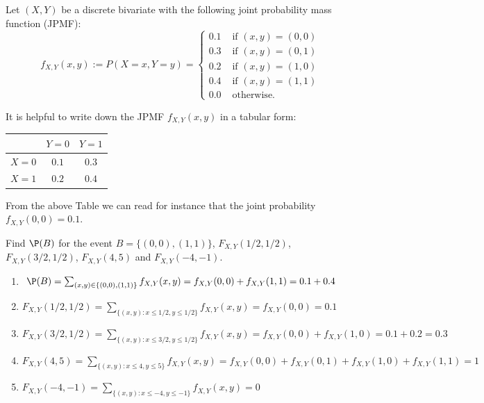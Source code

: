 \begin{example}\label{Eg:Discrete2DPMF}
Let $(X,Y)$ be a discrete bivariate \rv with the following joint probability mass function (JPMF):
\[
f_{X,Y}(x,y) := P (X=x,Y=y)  = 
\begin{cases}
0.1 & \text{ if } (x,y)=(0,0)\\
0.3 & \text{ if } (x,y)=(0,1)\\
0.2 & \text{ if } (x,y)=(1,0)\\
0.4 & \text{ if } (x,y)=(1,1)\\
0.0 & \text{ otherwise.}
\end{cases} 
\]
\begin{center}
\end{center}
It is helpful to write down the JPMF $f_{X,Y}(x,y)$ in a tabular form:
\begin{center}
\begin{tabular}{|c|c c|}
\hline
& $Y=0$ & $Y=1$ \\ \hline
$X=0$& $0.1$ & $0.3$  \\
$X=1$& $0.2$ & $0.4$  \\ \hline
\end{tabular}
\end{center}
From the above Table we can read for instance that the joint probability $f_{X,Y}(0,0)=0.1$.

Find $\P(B)$ for the event $B=\{(0,0),(1,1)\}$, $F_{X,Y}(1/2,1/2)$, $F_{X,Y}(3/2,1/2)$, $F_{X,Y}(4,5)$ and $F_{X,Y}(-4,-1)$.

\begin{enumerate}
\item $\P(B) = \sum_{(x,y) \in \{(0,0),(1,1)\}}f_{X,Y}(x,y) = f_{X,Y}(0,0)+f_{X,Y}(1,1)=0.1+0.4$
\item $F_{X,Y}(1/2,1/2) = \sum_{\{(x,y): x\leq 1/2, y \leq 1/2\}} f_{X,Y}(x,y)=f_{X,Y}(0,0)=0.1$
\item $F_{X,Y}(3/2,1/2) = \sum_{\{(x,y): x\leq 3/2, y \leq 1/2\}} f_{X,Y}(x,y)=f_{X,Y}(0,0)+f_{X,Y}(1,0)=0.1+0.2=0.3$
\item $F_{X,Y}(4,5) = \sum_{\{(x,y): x\leq 4, y \leq 5\}} f_{X,Y}(x,y)=f_{X,Y}(0,0)+f_{X,Y}(0,1)+f_{X,Y}(1,0)+f_{X,Y}(1,1)=1$
\item $F_{X,Y}(-4,-1) = \sum_{\{(x,y): x\leq -4, y \leq -1\}} f_{X,Y}(x,y)=0$
\end{enumerate}
\end{example}


